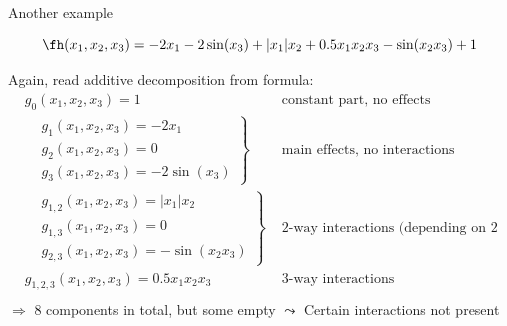 \documentclass[11pt,compress,t,notes=noshow, aspectratio=169, xcolor=table]{beamer}
\begin{document}
\begin{frame}{Another example}

    \begin{example}


        $$
        \fh(x_1, x_2, x_3) = - 2x_1 - 2\sin(x_3) + |x_1|x_2 + 0.5 x_1 x_2 x_3 - \sin(x_2 x_3) + 1
        $$

        Again, read additive decomposition from formula:
        \begin{equation}\label{eq:func_decomp_second_min_example}
        \begin{aligned}
            & g_0(x_1, x_2, x_3) = 1 & \text{ constant part, no effects}  \\
            &
            \left.\begin{aligned}
                & g_1(x_1, x_2, x_3) = - 2x_1 \\
                & g_2(x_1, x_2, x_3) = 0 \\
                & g_3(x_1, x_2, x_3) = - 2\sin(x_3)
            \end{aligned}\right\}
                & \text{ main effects, no interactions}  \\
            &
            \left.\begin{aligned}
                & g_{1,2}(x_1, x_2, x_3) = |x_1|x_2 \\
                & g_{1,3}(x_1, x_2, x_3) = 0 \\
                & g_{2,3}(x_1, x_2, x_3) = - \sin(x_2 x_3)
            \end{aligned}\right\}
                & \text{ 2-way interactions (depending on 2 features)}  \\
            & g_{1,2,3}(x_1, x_2, x_3) = 0.5 x_1 x_2 x_3 & \text{ 3-way interactions}  \\
        \end{aligned}
        \end{equation}
        \(\Rightarrow\) 8 components in total, but some empty $\leadsto$ Certain interactions not present
        
    \end{example}
    
\end{frame}
\end{document}
